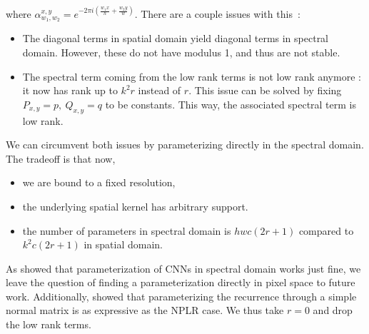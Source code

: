 \noindent where $\alpha_{w_1,w_2}^{x,y} = e^{-2\pi i(\frac{w_1x}{h}+\frac{w_2y}{w})}$. There are a couple issues with this~:
\begin{itemize}
    \item The diagonal terms in spatial domain yield diagonal terms in spectral domain. However, these do not have modulus 1, and thus are not stable.
    \item The spectral term coming from the low rank terms is not low rank anymore : it now has rank up to $k^2r$ instead of $r$. This issue can be solved by fixing $P_{x,y}=p,~Q_{x,y}=q$ to be constants. This way, the associated spectral term is low rank.
\end{itemize}
We can circumvent both issues by parameterizing directly in the spectral domain. The tradeoff is that now,
\begin{itemize}
    \item we are bound to a fixed resolution,
    \item the underlying spatial kernel has arbitrary support.
    \item the number of parameters in spectral domain is $hwc(2r+1)$ compared to $k^2c(2r+1)$ in spatial domain.
\end{itemize}
As \citet{TODO:franck} showed that parameterization of CNNs in spectral domain works just fine, we leave the question of finding a parameterization directly in pixel space to future work. Additionally, \citet{TODO} showed that parameterizing the recurrence through a simple normal matrix is as expressive as the NPLR case. We thus take $r=0$ and drop the low rank terms.

